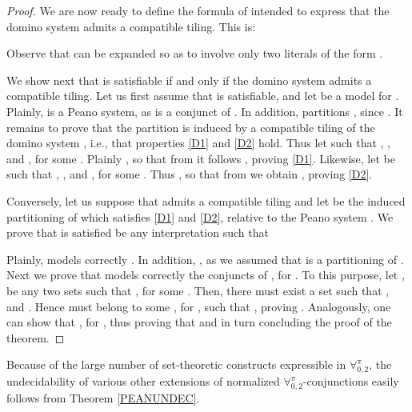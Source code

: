 \documentclass[submission,copyright,creativecommons]{eptcs}
\newcommand{\Lang}{\ensuremath{\mathbf{\forall}^{\pi}_{0,2}}\xspace}
\begin{document}
\begin{proof}
We are now ready to define the formula  of
 intended to express that the domino system
 admits a compatible tiling. This is:

Observe that  can be expanded so as to involve 
only two literals of the form .

We show next that  is satisfiable if and only if
the domino system  admits a compatible tiling.
Let us first assume that  is satisfiable, and
let  be a model for .  Plainly,  is a Peano system, as
 is a conjunct of .
In addition,  partitions
, since .  It remains to
prove that the partition  is
induced by a compatible tiling of the domino system ,
i.e., that properties \ref{D1} and \ref{D2} hold.  Thus let  such that ,
, and ,
for some .  Plainly , so that from  it
follows , proving \ref{D1}.  Likewise, let  be such that ,
, and ,
for some .  Thus , so that from  we obtain
, proving \ref{D2}.

Conversely, let us suppose that  admits a compatible
tiling and let  be the induced
partitioning of  which
satisfies \ref{D1} and \ref{D2}, relative to the Peano system
.
We prove that  is satisfied
be any interpretation  such that

Plainly,  models correctly .  In
addition, , as we assumed that  is a partitioning of
.
Next we prove that  models correctly the conjuncts 
of , for .  To this purpose,
let ,  be any two sets such that , for some .  Then, there
must exist a set  such that , and
.  Hence 
must belong to some , for , such that , proving .
Analogously, one can show that , for , thus proving that  and in turn concluding the proof of the theorem.
\end{proof}

Because of the large number of set-theoretic constructs expressible in
\Lang, the undecidability of various other extensions of normalized
\Lang-conjunctions easily follows from Theorem \ref{PEANUNDEC}.
\end{document}
